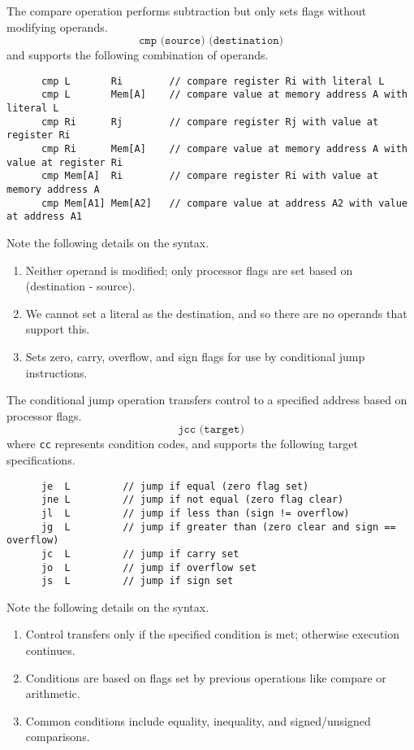   \begin{definition}[Compare]
    The compare operation performs subtraction but only sets flags without modifying operands.
    \begin{equation}
      \texttt{cmp (source) (destination)}
    \end{equation}
    and supports the following combination of operands.
    \begin{lstlisting}
      cmp L       Ri        // compare register Ri with literal L
      cmp L       Mem[A]    // compare value at memory address A with literal L
      cmp Ri      Rj        // compare register Rj with value at register Ri
      cmp Ri      Mem[A]    // compare value at memory address A with value at register Ri
      cmp Mem[A]  Ri        // compare register Ri with value at memory address A
      cmp Mem[A1] Mem[A2]   // compare value at address A2 with value at address A1
    \end{lstlisting}
    Note the following details on the syntax.
    \begin{enumerate}
      \item Neither operand is modified; only processor flags are set based on (destination - source).
      \item We cannot set a literal as the destination, and so there are no operands that support this.
      \item Sets zero, carry, overflow, and sign flags for use by conditional jump instructions.
    \end{enumerate}
  \end{definition}

  \begin{definition}
    The conditional jump operation transfers control to a specified address based on processor flags.
    \begin{equation}
      \texttt{jcc (target)}
    \end{equation}
    where \texttt{cc} represents condition codes, and supports the following target specifications.
    \begin{lstlisting}
      je  L         // jump if equal (zero flag set)
      jne L         // jump if not equal (zero flag clear)
      jl  L         // jump if less than (sign != overflow)
      jg  L         // jump if greater than (zero clear and sign == overflow)
      jc  L         // jump if carry set
      jo  L         // jump if overflow set
      js  L         // jump if sign set
    \end{lstlisting}
    Note the following details on the syntax.
    \begin{enumerate}
      \item Control transfers only if the specified condition is met; otherwise execution continues.
      \item Conditions are based on flags set by previous operations like compare or arithmetic.
      \item Common conditions include equality, inequality, and signed/unsigned comparisons.
    \end{enumerate}
  \end{definition}

